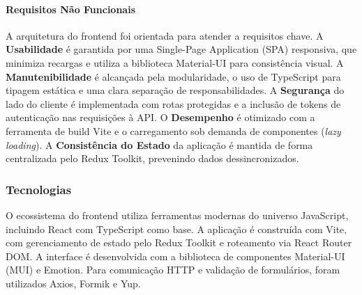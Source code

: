 \documentclass[portuguese]{sbc2025}%
\begin{document}
\paragraph{Requisitos Não Funcionais} A arquitetura do frontend foi orientada para atender a requisitos chave. A \textbf{Usabilidade} é garantida por uma Single-Page Application (SPA) responsiva, que minimiza recargas e utiliza a biblioteca Material-UI para consistência visual. A \textbf{Manutenibilidade} é alcançada pela modularidade, o uso de TypeScript para tipagem estática e uma clara separação de responsabilidades. A \textbf{Segurança} do lado do cliente é implementada com rotas protegidas e a inclusão de tokens de autenticação nas requisições à API. O \textbf{Desempenho} é otimizado com a ferramenta de build Vite e o carregamento sob demanda de componentes (\textit{lazy loading}). A \textbf{Consistência do Estado} da aplicação é mantida de forma centralizada pelo Redux Toolkit, prevenindo dados dessincronizados.

\subsubsection{Tecnologias}
O ecossistema do frontend utiliza ferramentas modernas do universo JavaScript, incluindo React com TypeScript como base. A aplicação é construída com Vite, com gerenciamento de estado pelo Redux Toolkit e roteamento via React Router DOM. A interface é desenvolvida com a biblioteca de componentes Material-UI (MUI) e Emotion. Para comunicação HTTP e validação de formulários, foram utilizados Axios, Formik e Yup.
\end{document}
